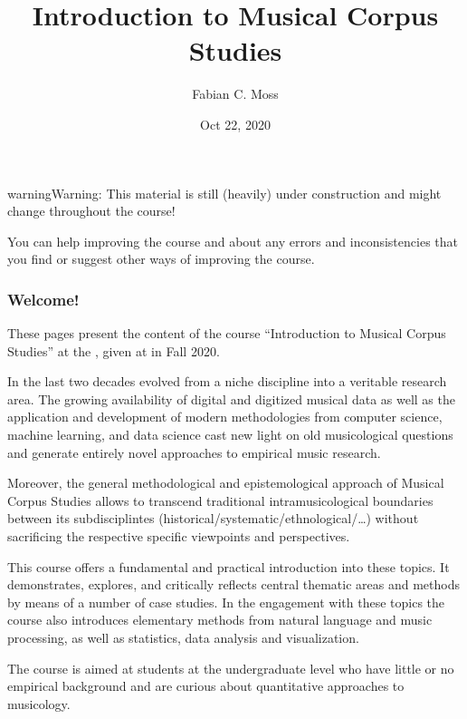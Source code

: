 \documentclass[letterpaper,10pt,english]{sphinxmanual}
\title{Introduction to Musical Corpus Studies}
\date{Oct 22, 2020}
\author{Fabian C.\@{} Moss}
\begin{document}
\pagestyle{empty}
\sphinxmaketitle
\pagestyle{plain}
\sphinxtableofcontents
\pagestyle{normal}
\label{\detokenize{index::doc}}


\begin{sphinxadmonition}{warning}{Warning:}
This material is still (heavily) under construction and might change throughout the course!

You can help improving the course and  about any errors and inconsistencies that you find
or suggest other ways of improving the course.
\end{sphinxadmonition}
\subsubsection*{Welcome!}

These pages present the content of the course “Introduction to Musical Corpus Studies” at the ,
given at  in Fall 2020.

In the last two decades  evolved from a niche discipline into a veritable research area.
The growing availability of digital and digitized musical data as well as the application and development of modern
methodologies from computer science, machine learning, and data science cast new light on old musicological questions
and generate entirely novel approaches to empirical music research.

Moreover, the general methodological and epistemological approach of Musical Corpus Studies allows to transcend traditional
intra\sphinxhyphen{}musicological boundaries between its sub\sphinxhyphen{}disciplintes (historical/systematic/ethnological/…) without sacrificing the
respective specific viewpoints and perspectives.

This course offers a fundamental and practical introduction into these topics.
It demonstrates, explores, and critically reflects central thematic areas and methods by means of a number of case studies.
In the engagement with these topics the course also introduces elementary methods from natural language and music processing,
as well as statistics, data analysis and visualization.

The course is aimed at students at the undergraduate level who have little or no empirical background and are curious
about quantitative approaches to musicology.
\end{document}
